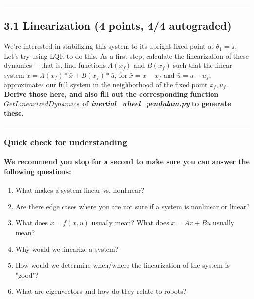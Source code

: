 \documentclass[11pt]{article}
\begin{document}
    \begin{center}\rule{0.5\linewidth}{\linethickness}\end{center}

\subsection{3.1 Linearization (4 points, 4/4
autograded)}\label{linearization-4-points-44-autograded}

We're interested in stabilizing this system to its upright fixed point
at \(\theta_1 = \pi\). Let's try using LQR to do this. As a first step,
calculate the linearization of these dynamics -\/- that is, find
functions \(A(x_f)\) and \(B(x_f)\) such that the linear system
\(\dot x = A(x_f)*\bar{x} + B(x_f)*\bar{u}\), for \(\bar{x} = x-x_f\)
and \(\bar{u} = u-u_f\), approximates our full system in the
neighborhood of the fixed point \(x_f, u_f\). \textbf{Derive those here,
and also fill out the corresponding function \(GetLinearizedDynamics\)
of \emph{inertial\_wheel\_pendulum.py} to generate these.}

    \begin{center}\rule{0.5\linewidth}{\linethickness}\end{center}

\subsubsection{Quick check for
understanding}\label{quick-check-for-understanding}

\paragraph{We recommend you stop for a second to make sure you can
answer the following
questions:}\label{we-recommend-you-stop-for-a-second-to-make-sure-you-can-answer-the-following-questions}

\begin{enumerate}
\def\labelenumi{\arabic{enumi}.}
\item
  What makes a system linear vs. nonlinear?
\item
  Are there edge cases where you are not sure if a system is nonlinear
  or linear?
\item
  What does \(\dot{x} = f(x,u)\) usually mean? What does
  \(\dot{x} = Ax + Bu\) usually mean?
\item
  Why would we linearize a system?
\item
  How would we determine when/where the linearization of the system is
  "good"?
\item
  What are eigenvectors and how do they relate to robots?
\end{enumerate}
\end{document}
